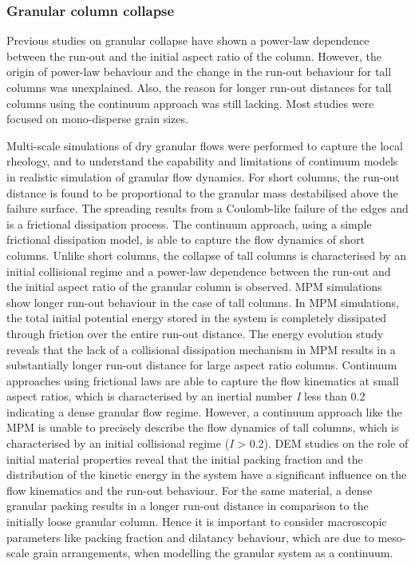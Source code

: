 \subsubsection*{Granular column collapse}

Previous studies on granular collapse have shown a power-law dependence between 
the run-out and the initial aspect ratio of the column. However, the origin of 
power-law behaviour and the change in the run-out behaviour for tall columns 
was unexplained. Also, the reason for longer run-out distances for 
tall columns using the continuum approach was still lacking. Most studies
were focused on mono-disperse grain sizes. 

Multi-scale simulations of dry granular flows were performed to capture the 
local rheology, and to understand the capability and limitations of continuum 
models in realistic simulation of granular flow dynamics. For short columns, 
the run-out distance is found to be proportional to the granular mass 
destabilised above the failure surface. The spreading results from a 
Coulomb-like failure of the edges and is a frictional dissipation process. The 
continuum approach, using a simple frictional dissipation model, is able to 
capture the flow dynamics of short columns. Unlike short columns, the collapse 
of tall columns is characterised by an initial collisional regime and a 
power-law dependence between the run-out and the initial aspect ratio of the 
granular column is observed. MPM simulations show longer run-out behaviour in 
the case of tall columns. In MPM simulations, the total initial 
potential energy stored in the system is completely dissipated through friction 
over the entire run-out distance. The energy evolution study reveals that the 
lack of a collisional dissipation mechanism in MPM results in a substantially 
longer run-out distance for large aspect ratio columns. Continuum 
approaches using frictional laws are able to capture the flow kinematics at 
small aspect ratios, which is characterised by an inertial 
number \textit{I} less than 0.2 indicating a dense granular flow regime. 
However, a continuum approach like the MPM is unable to precisely describe the 
flow dynamics of tall columns, which is characterised by an initial collisional 
regime (\textit{I} > 0.2). DEM studies on the role of initial material 
properties reveal that the initial packing fraction and the distribution of the 
kinetic energy in the system have a significant influence on the flow 
kinematics and the run-out behaviour. For the same material, a dense granular 
packing results in a longer run-out distance in comparison to the initially 
loose granular column. Hence it is important to consider macroscopic parameters 
like packing fraction and dilatancy behaviour, which are due to meso-scale 
grain arrangements, when modelling the granular system as a continuum.

